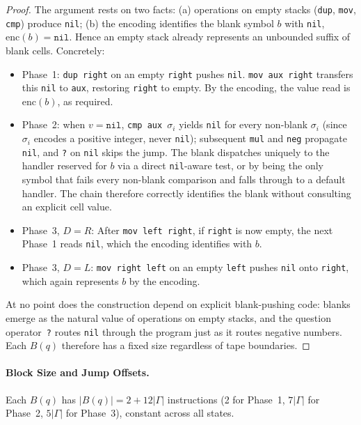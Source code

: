 \begin{proof}
The argument rests on two facts: (a) operations on empty stacks (\texttt{dup}, \texttt{mov}, \texttt{cmp}) produce \texttt{nil}; (b) the encoding identifies the blank symbol $b$ with \texttt{nil}, \ie $\mathrm{enc}(b) = \texttt{nil}$. Hence an empty stack already represents an unbounded suffix of blank cells. Concretely:
\begin{itemize}
    \item Phase~1: \texttt{dup right} on an empty \texttt{right} pushes \texttt{nil}. \texttt{mov aux right} transfers this \texttt{nil} to \texttt{aux}, restoring \texttt{right} to empty. By the encoding, the value read is $\mathrm{enc}(b)$, as required.
    \item Phase~2: when $v = \texttt{nil}$, \texttt{cmp aux $\sigma_i$} yields \texttt{nil} for every non-blank $\sigma_i$ (since $\sigma_i$ encodes a positive integer, never \texttt{nil}); subsequent \texttt{mul} and \texttt{neg} propagate \texttt{nil}, and \texttt{?} on \texttt{nil} skips the jump. The blank dispatches uniquely to the handler reserved for $b$ via a direct \texttt{nil}-aware test, or by being the only symbol that fails every non-blank comparison and falls through to a default handler. The chain therefore correctly identifies the blank without consulting an explicit cell value.
    \item Phase~3, $D = R$: After \texttt{mov left right}, if \texttt{right} is now empty, the next Phase~1 reads \texttt{nil}, which the encoding identifies with $b$.
    \item Phase~3, $D = L$: \texttt{mov right left} on an empty \texttt{left} pushes \texttt{nil} onto \texttt{right}, which again represents $b$ by the encoding.
\end{itemize}
At no point does the construction depend on explicit blank-pushing code: blanks emerge as the natural value of operations on empty stacks, and the question operator~\texttt{?} routes \texttt{nil} through the program just as it routes negative numbers. Each $B(q)$ therefore has a fixed size regardless of tape boundaries.
\end{proof}

\paragraph{Block Size and Jump Offsets.}
Each $B(q)$ has $|B(q)| = 2 + 12|\Gamma|$ instructions (2 for Phase~1, $7|\Gamma|$ for Phase~2, $5|\Gamma|$ for Phase~3), constant across all states.

